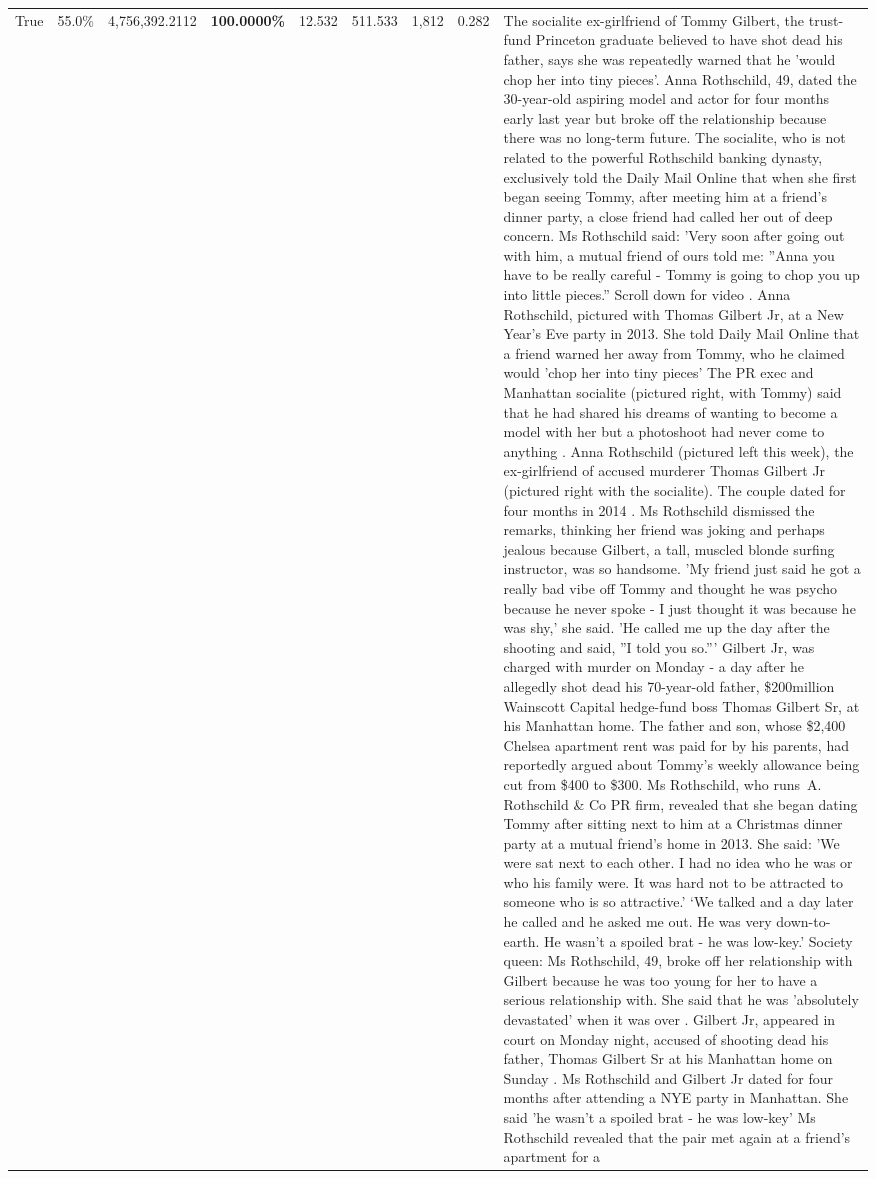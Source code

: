 \begin{table}[H]
\begin{tabular}{lllrlllll}
True & 55.0\% & 4,756,392.2112 & \bfseries \color{red} 100.0000\% & 12.532 & 511.533 & 1,812 & 0.282 & The socialite ex-girlfriend of Tommy Gilbert, the trust-fund Princeton graduate believed to have shot dead his father, says she was repeatedly warned that he 'would chop her into tiny pieces'. Anna Rothschild, 49, dated the 30-year-old aspiring model and actor for four months early last year but broke off the relationship because there was no long-term future. The socialite, who is not related to the powerful Rothschild banking dynasty, exclusively told the Daily Mail Online that when she first began seeing Tommy, after meeting him at a friend's dinner party, a close friend had called her out of deep concern. Ms Rothschild said: 'Very soon after going out with him, a mutual friend of ours told me: ''Anna you have to be really careful - Tommy is going to chop you up into little pieces.'' Scroll down for video . Anna Rothschild, pictured with Thomas Gilbert Jr, at a New Year's Eve party in 2013. She told Daily Mail Online that a friend warned her away from Tommy, who he claimed would 'chop her into tiny pieces' The PR exec and Manhattan socialite (pictured right, with Tommy) said that he had shared his dreams of wanting to become a model with her but a photoshoot had never come to anything . Anna Rothschild (pictured left this week), the ex-girlfriend of accused murderer Thomas Gilbert Jr (pictured right with the socialite). The couple dated for four months in 2014 . Ms Rothschild dismissed the remarks, thinking her friend was joking and perhaps jealous because Gilbert, a tall, muscled blonde surfing instructor, was so handsome. 'My friend just said he got a really bad vibe off Tommy and thought he was psycho because he never spoke - I just thought it was because he was shy,' she said. 'He called me up the day after the shooting and said, ''I told you so.''' Gilbert Jr, was charged with murder on Monday - a day after he allegedly shot dead his 70-year-old father, \$200million Wainscott Capital hedge-fund boss Thomas Gilbert Sr, at his Manhattan home. The father and son, whose \$2,400 Chelsea apartment rent was paid for by his parents, had reportedly argued about Tommy's weekly allowance being cut from \$400 to \$300. Ms Rothschild, who runs A. Rothschild \& Co PR firm, revealed that she began dating Tommy after sitting next to him at a Christmas dinner party at a mutual friend's home in 2013. She said: 'We were sat next to each other. I had no idea who he was or who his family were. It was hard not to be attracted to someone who is so attractive.' ‘We talked and a day later he called and he asked me out. He was very down-to-earth. He wasn’t a spoiled brat - he was low-key.’ Society queen: Ms Rothschild, 49, broke off her relationship with Gilbert because he was too young for her to have a serious relationship with. She said that he was 'absolutely devastated' when it was over . Gilbert Jr, appeared in court on Monday night, accused of shooting dead his father, Thomas Gilbert Sr at his Manhattan home on Sunday . Ms Rothschild and Gilbert Jr dated for four months after attending a NYE party in Manhattan. She said 'he wasn't a spoiled brat - he was low-key' Ms Rothschild revealed that the pair met again at a friend’s apartment for a 
\end{tabular}
\end{table}
